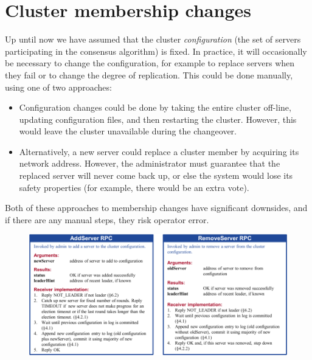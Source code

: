 \chapter{Cluster membership changes}
\label{membership}

Up until now we have assumed that the cluster \emph{configuration}
(the set of servers participating in the consensus algorithm) is fixed.
In practice, it will occasionally be necessary to change the
configuration, for example to replace servers when they fail or to
change the degree of replication. This could be done
manually, using one of two approaches:
\begin{itemize}
\item Configuration changes could be done by taking the entire cluster
off-line, updating configuration files, and then restarting the cluster.
However, this would leave the cluster unavailable during the changeover.
\item Alternatively, a new server could replace a cluster member by
acquiring its network address. However, the administrator must guarantee
that the replaced server will never come back up, or else the system
would lose its safety properties (for example, there would be an extra
vote).
\end{itemize}
Both of these approaches to membership changes have significant downsides,
and if there are any manual steps, they risk operator error.

\begin{figure}
\centering
\includegraphics[scale=0.95]{membership/cheatsheet2}
\label{fig:membership:cheatsheet2}
\end{figure}


